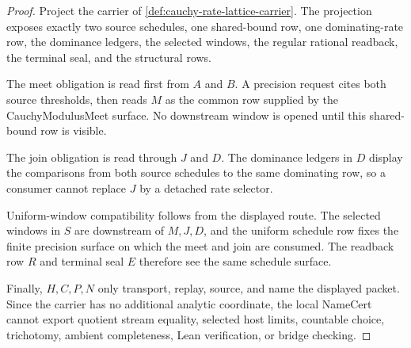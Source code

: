 \begin{proof}
Project the carrier of \autoref{def:cauchy-rate-lattice-carrier}. The projection exposes exactly two source schedules, one shared-bound row, one dominating-rate row, the dominance ledgers, the selected windows, the regular rational readback, the terminal seal, and the structural rows.

The meet obligation is read first from $A$ and $B$. A precision request cites both source thresholds, then reads $M$ as the common row supplied by the CauchyModulusMeet surface. No downstream window is opened until this shared-bound row is visible.

The join obligation is read through $J$ and $D$. The dominance ledgers in $D$ display the comparisons from both source schedules to the same dominating row, so a consumer cannot replace $J$ by a detached rate selector.

Uniform-window compatibility follows from the displayed route. The selected windows in $S$ are downstream of $M,J,D$, and the uniform schedule row fixes the finite precision surface on which the meet and join are consumed. The readback row $R$ and terminal seal $E$ therefore see the same schedule surface.

Finally, $H,C,P,N$ only transport, replay, source, and name the displayed packet. Since the carrier has no additional analytic coordinate, the local NameCert cannot export quotient stream equality, selected host limits, countable choice, trichotomy, ambient completeness, Lean verification, or bridge checking.
\end{proof}

